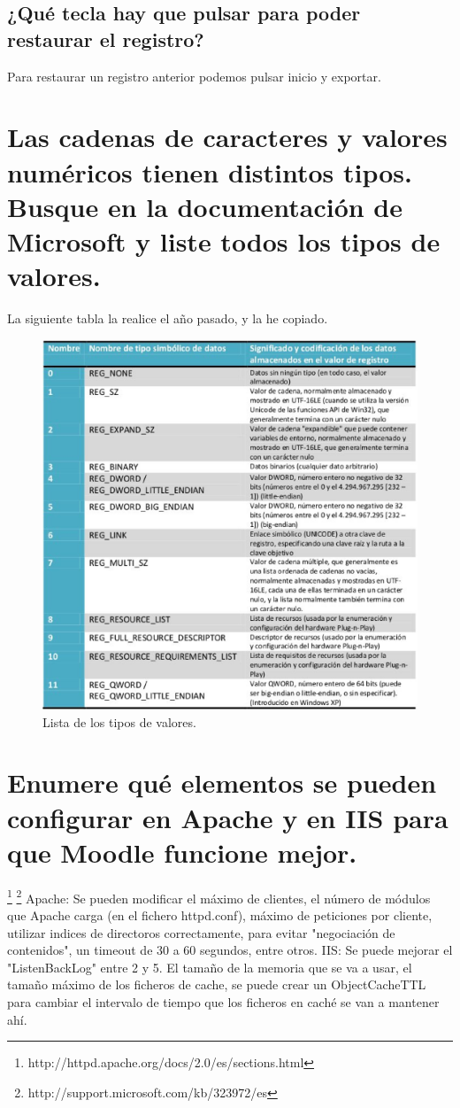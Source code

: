 \subsection{¿Qué tecla hay que pulsar para poder restaurar el registro?} 
Para restaurar un registro anterior podemos pulsar inicio y exportar.

\section{Las cadenas de caracteres y valores numéricos tienen distintos tipos. Busque en la documentación de Microsoft y liste todos los tipos de valores.}

La siguiente tabla la realice el año pasado, y la he copiado.

\begin{figure}[H]
\begin{center}
\includegraphics[scale=0.4]{imagenes/cuestion5.eps}
\caption{Lista de los tipos de valores.}
\end{center}
\end{figure}


\section{Enumere qué elementos se pueden configurar en Apache y en IIS para que Moodle funcione mejor.}
\footnote{http://httpd.apache.org/docs/2.0/es/sections.html}
\footnote{http://support.microsoft.com/kb/323972/es}
Apache: Se pueden modificar el máximo de clientes, el número de módulos que 
Apache carga (en el fichero httpd.conf), máximo de peticiones por cliente, utilizar 
indices de directoros correctamente, para evitar "negociación de contenidos", un 
timeout de 30 a 60 segundos, entre otros. 
IIS: Se puede mejorar el "ListenBackLog" entre 2 y 5. El tamaño de la memoria que se 
va a usar, el tamaño máximo de los ficheros de cache, se puede crear un 
ObjectCacheTTL para cambiar el intervalo de tiempo que los ficheros en caché se van a 
mantener ahí.

